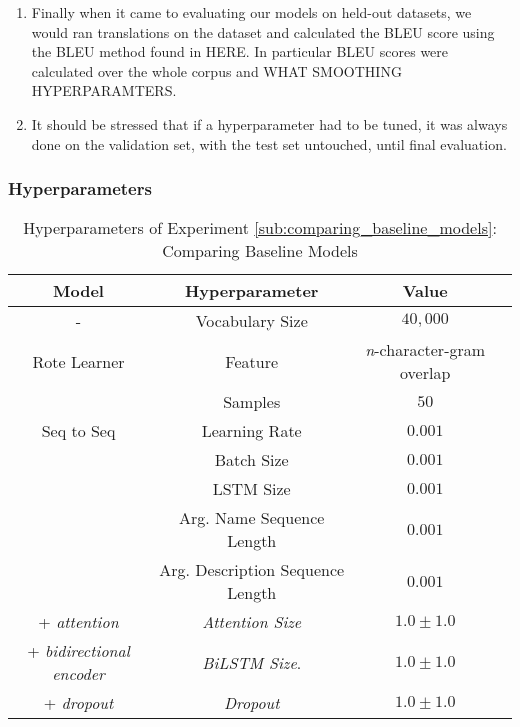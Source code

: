 \begin{enumerate}
    \item Finally when it came to evaluating our models on held-out datasets, we would ran translations on the dataset and calculated the BLEU score using the BLEU method found in HERE.
    In particular BLEU scores were calculated over the whole corpus and WHAT SMOOTHING HYPERPARAMTERS.
    \item It should be stressed that if a hyperparameter had to be tuned, it was always done on the validation set, with the test set untouched, until final evaluation.

\end{enumerate}

\subsubsection{Hyperparameters}

\begin{table}[h!]
\begin{center}
\begin{tabular}{ c | c | c | c }
    Model                           {}  & Hyperparameter  & Value    & \\
    \hline
    -                                 & Vocabulary Size                   & $40,000$ & \\
    \hline
    Rote Learner                      & Feature                           & \textit{n}-character-gram overlap & \\
                                      & Samples                           & $50$  & \\
    \hline
    Seq to Seq                        & Learning Rate                     & $0.001$  & \\
                                      & Batch Size                        & $0.001$  & \\
                                      & LSTM Size                         & $0.001$  & \\
                                      & Arg. Name Sequence Length         & $0.001$  & \\
                                      & Arg. Description Sequence Length  & $0.001$  & \\
    + \textit{attention}              & \textit{Attention Size}           & $1.0 \pm 1.0 $  & \\
    + \textit{bidirectional encoder}  & \textit{BiLSTM Size}.             & $1.0 \pm 1.0 $  & \\
    + \textit{dropout}                & \textit{Dropout}                  & $1.0 \pm 1.0 $  & \\
    \hline
\end{tabular}
\caption {Hyperparameters of Experiment \ref{sub:comparing_baseline_models}: Comparing Baseline Models }
\label{table:hyperparams_name_baseline}
\end{center}
\end{table}



